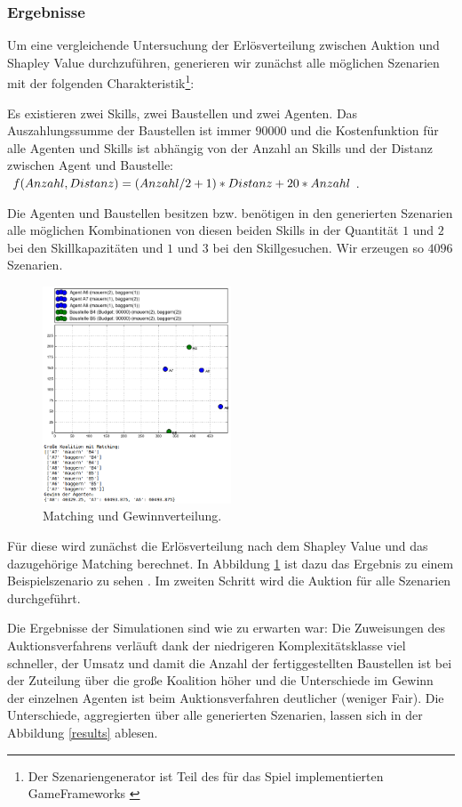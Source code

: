 \subsubsection{Ergebnisse}
Um eine vergleichende Untersuchung der Er\-lös\-ver\-tei\-lung zwischen Auktion und Shapley Value durchzuführen, generieren wir zunächst alle möglichen Szenarien mit der folgenden Charakteristik\footnote{Der Szenariengenerator ist Teil des für das Spiel implementierten GameFrameworks \cite{gitGame}}:

 Es existieren zwei Skills, zwei Baustellen und zwei Agenten. Das Auszahlungssumme der Baustellen ist immer $90000$ und die Kostenfunktion für alle Agenten und Skills ist abhängig von der Anzahl an Skills und der Distanz zwischen Agent und Baustelle: $f(Anzahl, \-Distanz)\- = (Anzahl/2+1)\-*Distanz\-+20*Anzahl$.

Die Agenten und Baustellen besitzen bzw. benötigen in den generierten Szenarien alle möglichen Kombinationen von diesen beiden Skills in der Quantität $1$ und $2$ bei den Skillkapazitäten und $1$ und $3$ bei den Skillgesuchen. Wir erzeugen so $4096$ Szenarien. 

\begin{figure}
  \centering
  \includegraphics[width=0.5\textwidth]{example-shapley-value.png}
  \caption{Matching und Gewinnverteilung.}
  \label{example-shapley-value}
\end{figure}

Für diese wird zunächst die Erlösverteilung nach dem Shapley Value und das dazugehörige Matching berechnet. In Abbildung \ref{example-shapley-value} ist dazu das Ergebnis zu einem Beispielszenario zu sehen \cite{gitShapley}. Im zweiten Schritt wird die Auktion für alle Szenarien durchgeführt.

Die Ergebnisse der Simulationen sind wie zu erwarten war: Die Zuweisungen des Auktionsverfahrens verläuft dank der niedrigeren Komplexitätsklasse viel schneller, der Umsatz und damit die Anzahl der fertiggestellten Baustellen ist bei der Zuteilung über die große Koalition höher und die Unterschiede im Gewinn der einzelnen Agenten ist beim Auktionsverfahren deutlicher (weniger Fair). Die Unterschiede, aggregierten über alle generierten Szenarien, lassen sich in der Abbildung \ref{results} ablesen.

